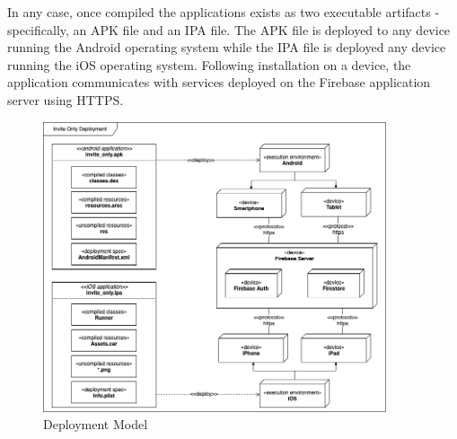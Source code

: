 In any case, once compiled the applications exists as two executable artifacts - specifically, an APK file and an IPA file. The APK file is deployed to any device running the Android operating system while the IPA file is deployed any device running the iOS operating system. Following installation on a device, the application communicates with services deployed on the Firebase application server using HTTPS.

\begin{figure}[H]
  \centering
  \includegraphics[width=0.9\textwidth]{documentation/software_requirements_specification/architecture/deployment_model.png}
  \caption{Deployment Model}
  \label{fig:deployment_model}
\end{figure}